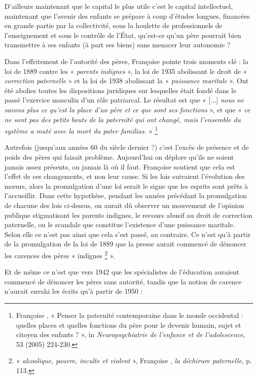  D'ailleurs maintenant que le capital le plus utile c'est le capital intellectuel, maintenant que l'avenir des enfants se prépare à coup d'études longues, financées en grande partie par la collectivité, sous la houlette de professionnels de l'enseignement et sous le contrôle de l'État, qu'est-ce qu'un père pourrait bien transmettre à ses enfants (à part ses biens) sans menacer leur autonomie ?

 Dans l'effritement de l'autorité des pères, Françoise  pointe trois moments clé : la loi de 1889 contre les « \emph{parents indignes} », la loi de 1935 abolissant le droit de « \emph{correction paternelle} » et la loi de 1938 abolissant la « \emph{puissance maritale} ». Ont été abolies toutes les dispositions juridiques sur lesquelles était fondé dans le passé l'exercice masculin d'un rôle patriarcal. Le résultat est que « [...] \emph{nous ne savons plus ce qu'est la place d'un père et ce que sont ses fonctions} », et que « \emph{ce ne sont pas des petits bouts de la paternité qui ont changé, mais l'ensemble du système a muté avec la mort du \emph{pater familias}.} »%
\footnote{Françoise , « Penser la paternité contemporaine dans le monde occidental : quelles places et quelles fonctions du père pour le devenir humain, sujet et citoyen des enfants ? », in \emph{Neuropsychiatrie de l'enfance et de l'adolescence}, 53 (2005) 224-230.} 

 Autrefois (jusqu'aux années 60 du siècle dernier ?) c'est l'excès de présence et de poids des pères qui faisait problème. Aujourd'hui on déplore qu'ils ne soient jamais assez présents, ou jamais là où il faut. Françoise  soutient que cela est l'effet de ces changements, et non leur cause. Si les lois suivaient l'évolution des mœurs, alors la promulgation d'une loi serait le signe que les esprits sont prêts à l'accueillir. Dans cette hypothèse, pendant les années précédant la promulgation de chacune des lois ci-dessus, on aurait dû observer un mouvement de l'opinion publique stigmatisant les parents indignes, le recours abusif au droit de correction paternelle, ou le scandale que constitue l'existence d'une puissance maritale. Selon elle ce n'est pas ainsi que cela s'est passé, au contraire. Ce n'est qu'à partir de la promulgation de la loi de 1889 que la presse aurait commencé de dénoncer les carences des pères « indignes%
\footnote{« \emph{alcoolique, pauvre, inculte et violent} », Françoise , \emph{la déchirure paternelle}, p. 113.} 
 ».

 Et de même ce n'est que vers 1942 que les spécialistes de l'éducation auraient commencé de dénoncer les pères sans autorité, tandis que la notion de carence n'aurait envahi les écrits qu'à partir de 1950 :
 
